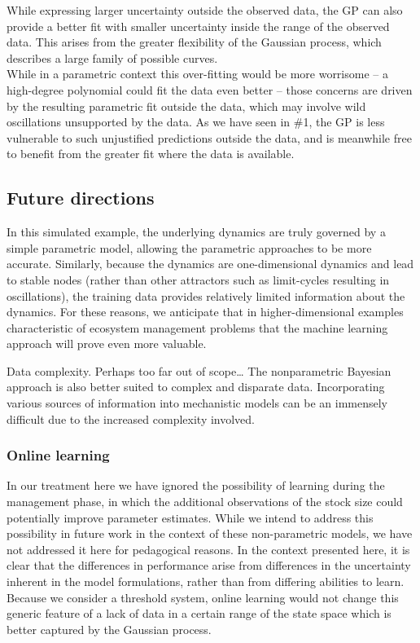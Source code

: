 \documentclass[author-year, review]{elsarticle} %
\begin{document}
While expressing larger uncertainty outside the observed data, the GP
can also provide a better fit with smaller uncertainty inside the range
of the observed data. This arises from the greater flexibility of the
Gaussian process, which describes a large family of possible
curves.\\While in a parametric context this over-fitting would be more
worrisome -- a high-degree polynomial could fit the data even better --
those concerns are driven by the resulting parametric fit outside the
data, which may involve wild oscillations unsupported by the data. As we
have seen in \#1, the GP is less vulnerable to such unjustified
predictions outside the data, and is meanwhile free to benefit from the
greater fit where the data is available.

\subsection{Future directions}

In this simulated example, the underlying dynamics are truly governed by
a simple parametric model, allowing the parametric approaches to be more
accurate. Similarly, because the dynamics are one-dimensional dynamics
and lead to stable nodes (rather than other attractors such as
limit-cycles resulting in oscillations), the training data provides
relatively limited information about the dynamics. For these reasons, we
anticipate that in higher-dimensional examples characteristic of
ecosystem management problems that the machine learning approach will
prove even more valuable.

 Data complexity. Perhaps too far out of scope\ldots{} The nonparametric
Bayesian approach is also better suited to complex and disparate data.
Incorporating various sources of information into mechanistic models can
be an immensely difficult due to the increased complexity involved.

\subsubsection{Online learning}

In our treatment here we have ignored the possibility of learning during
the management phase, in which the additional observations of the stock
size could potentially improve parameter estimates. While we intend to
address this possibility in future work in the context of these
non-parametric models, we have not addressed it here for pedagogical
reasons. In the context presented here, it is clear that the differences
in performance arise from differences in the uncertainty inherent in the
model formulations, rather than from differing abilities to learn.
Because we consider a threshold system, online learning would not change
this generic feature of a lack of data in a certain range of the state
space which is better captured by the Gaussian process.
\end{document}
